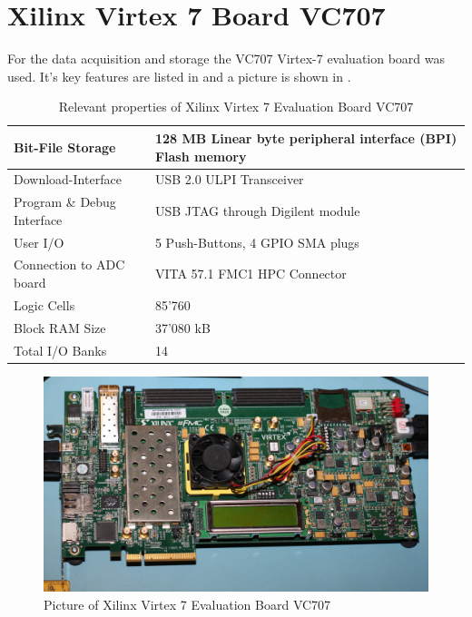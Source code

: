 \section{Xilinx Virtex 7 Board VC707}
\label{sec:comp_vc707}
For the data acquisition and storage the VC707 Virtex-7 evaluation board
was used. It's key features are listed in  and a
picture is shown in .

\begin{table}[h]
  \centering
  \begin{tabular}{|l|l|}
    \hline
    Bit-File Storage & 128 MB Linear byte peripheral interface (BPI) Flash memory \\ \hline
    Download-Interface & USB 2.0 ULPI Transceiver \\ \hline
    Program \& Debug Interface & USB JTAG through Digilent module \\ \hline
    User I/O & 5 Push-Buttons, 4 GPIO SMA plugs \\ \hline
    Connection to \gls{ADC} board & VITA 57.1 FMC1 HPC Connector \\ \hline
    Logic Cells & 85'760 \\ \hline
    Block RAM Size &  37'080 kB \\ \hline
    Total I/O Banks & 14 \\ \hline
  \end{tabular}
  \caption{Relevant properties of Xilinx Virtex 7 Evaluation Board VC707
    \cite{xilinx_virtex7_overview, xilinx_vc707}}
  \label{tab:comp_vc707}
\end{table}

\begin{figure}[p]
  \centering
  \includegraphics[width=\textwidth]{pictures/vc707}
  \caption{Picture of Xilinx Virtex 7 Evaluation Board VC707}
  \label{fig:comp_vc707_pic}
\end{figure}

